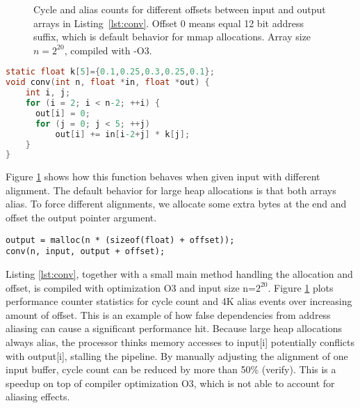 \documentclass[a4paper,10pt,twocolumn,twoside]{article}
\begin{document}
\begin{figure}[t]
  \caption{Cycle and alias counts for different offsets between input and output arrays in Listing~\ref{lst:conv}. Offset 0 means equal 12 bit address suffix, which is default behavior for mmap allocations. Array size $n=2^{20}$, compiled with -O3. }
  \label{fig:heapalias}
\end{figure}

\begin{lstlisting}[float=t, language=C, caption={Naive implementation of convolution. Highly sensitive to aliasing between input and output arrays.}, label={lst:conv}, frame=lines]
static float k[5]={0.1,0.25,0.3,0.25,0.1};
void conv(int n, float *in, float *out) {
    int i, j;
    for (i = 2; i < n-2; ++i) {
      out[i] = 0;
      for (j = 0; j < 5; ++j)
          out[i] += in[i-2+j] * k[j];
    }
}
\end{lstlisting}


Figure \ref{fig:heapalias} shows how this function behaves when given input with different alignment.
The default behavior for large heap allocations is that both arrays alias.
To force different alignments, we allocate some extra bytes at the end and offset the output pointer argument.

\begin{lstlisting}
output = malloc(n * (sizeof(float) + offset));
conv(n, input, output + offset);
\end{lstlisting}

Listing \ref{lst:conv}, together with a small main method handling the allocation and offset, is compiled with optimization O3 and input size n=$2^{20}$.
Figure \ref{fig:heapalias} plots performance counter statistics for cycle count and 4K alias events over increasing amount of offset.
This is an example of how false dependencies from address aliasing can cause a significant performance hit.
Because large heap allocations always alias, the processor thinks memory accesses to input[i] potentially conflicts with output[i], stalling the pipeline.
By manually adjusting the alignment of one input buffer, cycle count can be reduced by more than 50\% (verify).
This is a speedup on top of compiler optimization O3, which is not able to account for aliasing effects.
\end{document}
